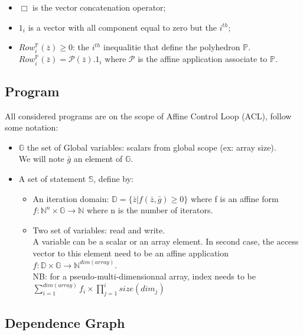 \begin{itemize}
	\item $ \Box $ is the vector concatenation operator;
	\item $ 1_{i} $ is a vector with all component equal to zero but the $i^{th}$;
	\item $ Row_{i}^{\mathbb{P}}(\bar{z}) \geq 0 $: the $i^{th}$ inequalitie that define the polyhedron $\mathbb{P}$.\\
	$Row_{i}^{\mathbb{P}}(\bar{z}) = \mathcal{P}(\bar{z}).1_{i}$ where $\mathcal{P}$ is the affine application associate
	to $\mathbb{P}$.
\end{itemize}
		\subsection{Program}
		\label{polyhedric:maths:}

All considered programs are on the scope of Affine Control Loop (ACL), follow some notation:
\begin{itemize}
	\item $\mathbb{G}$ the set of Global variables: scalars from global scope (ex: array size).\\
	We will note $\bar{g}$ an element of $\mathbb{G}$.
	\item A set of statement $\mathbb{S}$, define by:
	\begin{itemize}
		\item An iteration domain: $\mathbb{D} = \{\bar{z} | f(\bar{z}, \bar{g}) \geq 0\}$ where f is an affine
				form $f: \mathbb{N}^{n} \times \mathbb{G} \rightarrow \mathbb{N}$ where n is the number
				of iterators.
		\item Two set of variables: read and write.\\
		A variable can be a scalar or an array element. In second case, the access vector to this element need to
		be an affine application $f: \mathbb{D} \times \mathbb{G} \rightarrow \mathbb{N}^{dim(array)}$.\\
		NB: for a pseudo-multi-dimensionnal array, index needs to be 
		$\sum_{i=1}^{dim(array)} f_{i} \times \prod_{j=1}^{i} size(dim_{j})$
	\end{itemize}
\end{itemize}

		\subsection{Dependence Graph}

